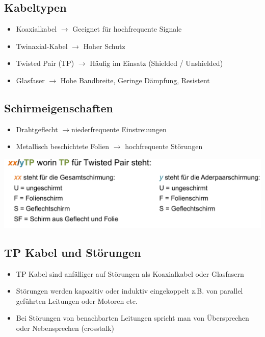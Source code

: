 \subsection{Kabeltypen}{
    \begin{itemize}[noitemsep]
        \item Koaxialkabel $\to$ Geeignet für hochfrequente Signale
        \item Twinaxial-Kabel $\to$ Hoher Schutz
        \item Twisted Pair (TP) $\to$ Häufig im Einsatz (Shielded / Unshielded)
        \item Glasfaser $\to$ Hohe Bandbreite, Geringe Dämpfung, Resistent
    \end{itemize}
}
\subsection{Schirmeigenschaften}
{ \begin{itemize}[noitemsep]
        \item Drahtgeflecht $\to$niederfrequente Einstreuungen
        \item Metallisch beschichtete Folien $\to$ hochfrequente Störungen
    \end{itemize}}
{   {\includegraphics[scale=.225]{img/twisted.png}}}

\subsection{TP Kabel und Störungen}{
    \begin{itemize}[noitemsep]
        \item TP Kabel sind anfälliger auf Störungen als Koaxialkabel oder Glasfasern
        \item Störungen werden kapazitiv oder induktiv eingekoppelt z.B. von parallel geführten Leitungen oder Motoren etc.
        \item Bei Störungen von benachbarten Leitungen spricht man von Übersprechen oder
              Nebensprechen (crosstalk)
    \end{itemize}}
\WhiteSpace

